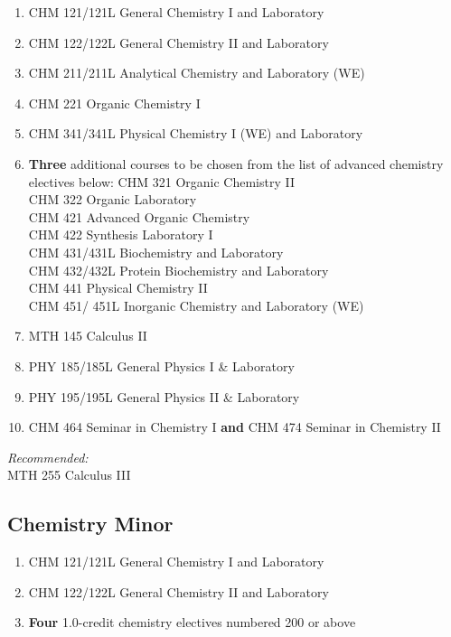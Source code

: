 \documentclass[
  letterpaper,
]{scrbook}
\providecommand{\tightlist}{%
  \setlength{\itemsep}{0pt}\setlength{\parskip}{0pt}}
\begin{document}
\begin{enumerate}
\def\labelenumi{\arabic{enumi}.}
\tightlist
\item
  CHM 121/121L General Chemistry I and Laboratory\\
\item
  CHM 122/122L General Chemistry II and Laboratory\\
\item
  CHM 211/211L Analytical Chemistry and Laboratory (WE)\\
\item
  CHM 221 Organic Chemistry I\\
\item
  CHM 341/341L Physical Chemistry I (WE) and Laboratory\\
\item
  \textbf{Three} additional courses to be chosen from the list of
  advanced chemistry electives below: CHM 321 Organic Chemistry II\\
  CHM 322 Organic Laboratory\\
  CHM 421 Advanced Organic Chemistry\\
  CHM 422 Synthesis Laboratory I\\
  CHM 431/431L Biochemistry and Laboratory\\
  CHM 432/432L Protein Biochemistry and Laboratory\\
  CHM 441 Physical Chemistry II\\
  CHM 451/ 451L Inorganic Chemistry and Laboratory (WE)\\
\item
  MTH 145 Calculus II\\
\item
  PHY 185/185L General Physics I \& Laboratory\\
\item
  PHY 195/195L General Physics II \& Laboratory\\
\item
  CHM 464 Seminar in Chemistry I \textbf{and} CHM 474 Seminar in
  Chemistry II
\end{enumerate}

\emph{Recommended:}\\
MTH 255 Calculus III

\subsection{Chemistry Minor}\label{chemistry-minor}

\begin{enumerate}
\def\labelenumi{\arabic{enumi}.}
\tightlist
\item
  CHM 121/121L General Chemistry I and Laboratory\\
\item
  CHM 122/122L General Chemistry II and Laboratory\\
\item
  \textbf{Four} 1.0-credit chemistry electives numbered 200 or above
\end{enumerate}
\end{document}
